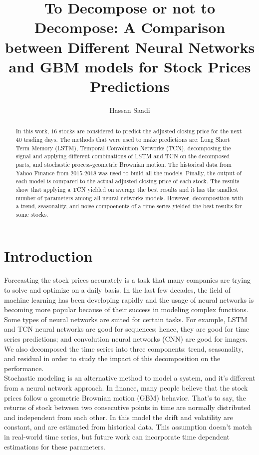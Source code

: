 \documentclass[12pt, A4]{article}
\title{To Decompose or not to Decompose: A Comparison between Different Neural Networks and GBM models for Stock Prices Predictions}
\author{Hassan Saadi}
\begin{document}
	\date{}
	\maketitle
\begin{abstract}
	In this work, $16$ stocks are considered to predict the adjusted closing price for the next $40$ trading days. The methods that were used to make predictions are: Long Short Term Memory (LSTM), Temporal Convolution Networks (TCN), decomposing the signal and applying different combinations of LSTM and TCN on the decomposed parts, and stochastic process-geometric Brownian motion. The historical data from Yahoo Finance from $2015$-$2018$ was used to build all the models. Finally, the output of each model is compared to the actual adjusted closing price of each stock. The results show that applying a TCN yielded on average the best results and it has the smallest number of parameters among all neural networks models. However, decomposition with a trend, seasonality, and noise compoenents of a time series yielded the best results for some stocks. 

\end{abstract}

\section{Introduction}
Forecasting the stock prices accurately is a task that many companies are trying to solve and optimize on a daily basis. In the last few decades, the field of machine learning has been developing rapidly and the usage of neural networks is becoming more popular because of their success in modeling complex functions. Some types of neural networks are suited for certain tasks. For example, LSTM and TCN neural networks are good for sequences; hence, they are good for time series predictions; and convolution neural networks (CNN) are good for images. We also decomposed the time series into three components: trend, seasonality, and residual in order to study the impact of this decomposition on the performance.  \\

Stochastic modeling is an alternative method to model a system, and it's different from a neural network approach. In finance, many people believe that the stock prices follow a geometric Brownian motion (GBM) behavior. That's to say, the returns of stock between two consecutive points in time are normally distributed and independent from each other. In this model the drift and volatility are constant, and are estimated from historical data. This assumption doesn't match in real-world time series, but future work can incorporate time dependent estimations for these parameters.\\
\end{document}
